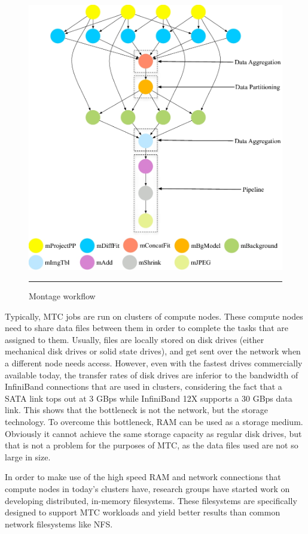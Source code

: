 \begin{figure}[H]
  \centering
    \includegraphics[scale=0.35]{Figures/montage.jpg}
    \rule{25em}{0.5pt}
  \caption[Montage workflow]{Montage workflow}
  \label{fig:montage}
\end{figure}

Typically, MTC jobs are run on clusters of compute nodes. These compute nodes need to share data files between them in order to complete the tasks that are assigned to them. Usually, files are locally stored on disk drives (either mechanical disk drives or solid state drives), and get sent over the network when a different node needs access. However, even with the fastest drives commercially available today, the transfer rates of disk drives are inferior to the bandwidth of InfiniBand connections that are used in clusters, considering the fact that a SATA link tops out at 3 GBps while InfiniBand 12X supports a 30 GBps data link. This shows that the bottleneck is not the network, but the storage technology. To overcome this bottleneck, RAM can be used as a storage medium. Obviously it cannot achieve the same storage capacity as regular disk drives, but that is not a problem for the purposes of MTC, as the data files used are not so large in size.

In order to make use of the high speed RAM and network connections that compute nodes in today's clusters have, research groups have started work on developing distributed, in-memory filesystems. These filesystems are specifically designed to support MTC workloads and yield better results than common network filesystems like NFS.


